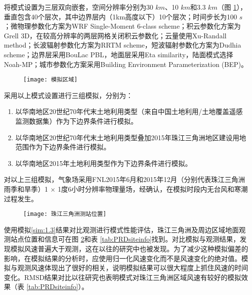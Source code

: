 将模式设置为三层双向嵌套，空间分辨率分别为30 $km$、10 $km$和3.3 $km$（图 \ref{fig:PRDmodeldomain}），垂直包含40个层次，其中边界层内（1km高度以下）10个层次；时间步长为100 $s$；微物理参数化方案为WRF Single-Moment 6-class scheme；积云参数化方案为Grell 3D，在较高分辨率的两层网格关闭积云参数化；云量使用Xu-Randall method；长波辐射参数化方案为RRTM scheme，短波辐射参数化方案为Dudhia scheme；边界层采用BouLac PBL，地面层采用Eta similarity，陆面模式选择Noah-MP；城市参数化方案采用Building Environment Parameterization (BEP)。

\begin{figure}[!htbp]
    \centering
    \texttt{[image: 模拟区域]}
    \label{fig:PRDmodeldomain}
\end{figure}

采用以上模式设置进行三组模拟，分别为：

\begin{enumerate}

\item \label{sim:1.1} 以华南地区20世纪70年代末土地利用类型（来自中国土地利用/土地覆盖遥感监测数据集）作为下边界条件进行模拟。

\item \label{sim:1.2} 以华南地区20世纪70年代末土地利用类型叠加2015年珠江三角洲地区建设用地范围作为下边界条件进行模拟。
	
\item \label{sim:1.3} 以华南地区2015年土地利用类型作为下边界条件进行模拟。

\end{enumerate}

对以上三组模拟，气象场采用FNL2015年6月和2015年12月（分别代表珠江三角洲雨季和旱季）1 $\times$ 1度6小时分辨率物理量场，经确认，在模拟时段内无台风和寒潮过程发生。

\begin{figure}[!htbp]
    \centering
    \texttt{[image: 珠江三角洲测站位置]}
    \label{fig:PRDobssites}
\end{figure}

使用模拟\ref{sim:1.3}结果对比观测进行模式性能评估，珠江三角洲及周边区域地面观测站点位置和信息可在图 \ref{fig:PRDobssites}和表 \ref{tab:PRDsiteinfo}找到。对比模拟与观测结果，发现模拟风速普遍大于观测，这在以往的研究中也被发现\citep{zhang2010modeling, yu2015evaluation, zha2019numerical}。为了减少这种模拟偏差的影响，在模拟结果的分析时，应使用归一化风速变化而不是风速变化的绝对值。模拟与观测风速体现出了很好的相关，说明模拟结果可以很大程度上抓住风速的时间变化。RMSD结果对比以往研究\citep{zhang2010modeling, zha2019numerical}也表明模式对珠江三角洲区域风速有较好的模拟效果（表 \ref{tab:PRDsiteinfo}）。

